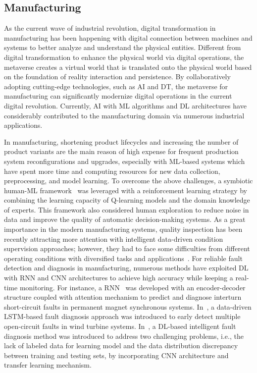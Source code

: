 \documentclass[journal]{IEEEtran}
\begin{document}
\subsection{Manufacturing}
As the current wave of industrial revolution, digital transformation in manufacturing has been happening with digital connection between machines and systems to better analyze and understand the physical entities. Different from digital transformation to enhance the physical world via digital operations, the metaverse creates a virtual world that is translated onto the physical world based on the foundation of reality interaction and persistence. By collaboratively adopting cutting-edge technologies, such as AI and DT, the metaverse for manufacturing can significantly modernize digital operations in the current digital revolution.
Currently, AI with ML algorithms and DL architectures have considerably contributed to the manufacturing domain via numerous industrial applications.

In manufacturing, shortening product lifecycles and increasing the number of product variants are the main reason of high expense for frequent production system reconfigurations and upgrades, especially with ML-based systems which have spent more time and computing resources for new data collection, preprocessing, and model learning. To overcome the above challenges, a symbiotic human-ML framework~\cite{doltsinis2018symbiotic} was leveraged with a reinforcement learning strategy by combining the learning capacity of Q-learning models and the domain knowledge of experts. This framework also considered human exploration to reduce noise in data and improve the quality of automatic decision-making systems.
As a great importance in the modern manufacturing systems, quality inspection has been recently attracting more attention with intelligent data-driven condition supervision approaches; however, they had to face some difficulties from different operating conditions with diversified tasks and applications~\cite{azamfar2020deep}. For reliable fault detection and diagnosis in manufacturing, numerous methods have exploited DL with RNN and CNN architectures to achieve high accuracy while keeping a real-time monitoring. 
For instance, a RNN~\cite{lee2021attention} was developed with an encoder-decoder structure coupled with attention mechanism to predict and diagnose interturn short-circuit faults in permanent magnet synchronous systems. 
In~\cite{xue2020diagnosis}, a data-driven LSTM-based fault diagnosis approach was introduced to early detect multiple open-circuit faults in wind turbine systems. 
In~\cite{guo2019deep}, a DL-based intelligent fault diagnosis method was introduced to address two challenging problems, i.e., the lack of labeled data for learning model and the data distribution discrepancy between training and testing sets, by incorporating CNN architecture and transfer learning mechanism.
\end{document}
